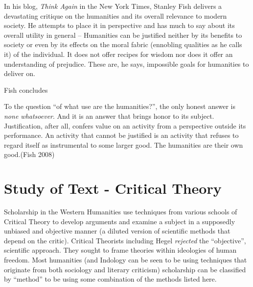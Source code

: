 In his blog, {\sl Think Again} in the New York Times, Stanley Fish delivers a devastating critique on the humanities and its overall relevance to modern society. He attempts to place it in perspective and has much to say about its overall utility in general – Humanities can be justified neither by its benefits to society or even by its effects on the moral fabric (ennobling qualities as he calls it) of the individual. It does not offer recipes for  wisdom nor does it offer an understanding of prejudice. These are, he says, impossible goals for humanities to deliver on. 

Fish concludes
\begin{myquote}
To the question ``of what use are the humanities?'', the only honest answer is {\sl none whatsoever}. And it is an answer that brings honor to its subject. Justification, after all, confers value on an activity from a perspective outside its performance. An activity that cannot be justified is an activity that refuses to regard itself as instrumental to some larger good. The humanities are their own good.\hfill (Fish 2008)
\end{myquote}

\section*{Study of Text - Critical Theory}

Scholarship in the Western Humanities use techniques from various schools of Critical Theory to develop arguments and examine a subject in a supposedly unbiased and objective manner (a diluted version of scientific methods that depend on the critic). Critical Theorists including Hegel {\sl rejected} the ``objective'', scientific approach. They sought to frame theories within ideologies of human freedom. Most humanities (and Indology can be seen to be using techniques that originate from both sociology and literary criticism) scholarship can be classified by ``method'' to be using some combination of the methods listed here.

